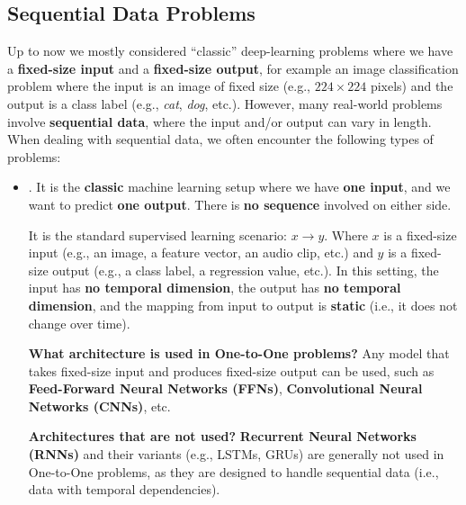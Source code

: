 \subsection{Sequential Data Problems}

Up to now we mostly considered ``classic'' deep-learning problems where we have a \textbf{fixed-size input} and a \textbf{fixed-size output}, for example an image classification problem where the input is an image of fixed size (e.g., $224 \times 224$ pixels) and the output is a class label (e.g., \emph{cat}, \emph{dog}, etc.). However, many real-world problems involve \textbf{sequential data}, where the input and/or output can vary in length. When dealing with sequential data, we often encounter the following types of problems:
\begin{itemize}
    \item[\textcolor{Red3}{\faIcon{book}}] . It is the \textbf{classic} machine learning setup where we have \textbf{one input}, and we want to predict \textbf{one output}. There is \textbf{no sequence} involved on either side.

    It is the standard supervised learning scenario: $x \to y$. Where $x$ is a fixed-size input (e.g., an image, a feature vector, an audio clip, etc.) and $y$ is a fixed-size output (e.g., a class label, a regression value, etc.). In this setting, the input has \textbf{no temporal dimension}, the output has \textbf{no temporal dimension}, and the mapping from input to output is \textbf{static} (i.e., it does not change over time).

    \textcolor{Green3}{ \textbf{What architecture is used in One-to-One problems?}} Any model that takes fixed-size input and produces fixed-size output can be used, such as \textbf{Feed-Forward Neural Networks (FFNs)}, \textbf{Convolutional Neural Networks (CNNs)}, etc.

    \textcolor{Red2}{ \textbf{Architectures that are not used?}} \textbf{Recurrent Neural Networks (RNNs)} and their variants (e.g., LSTMs, GRUs) are generally not used in One-to-One problems, as they are designed to handle sequential data (i.e., data with temporal dependencies).



\end{itemize}
